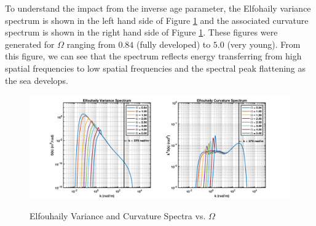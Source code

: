 To understand the impact from the inverse age parameter, the Elfohaily variance spectrum is shown in the left hand side of Figure \ref{os_fig:3a} and the associated curvature spectrum is shown in the right hand side of Figure \ref{os_fig:3a}. These figures were generated for $\Omega$ ranging from $0.84$ (fully developed) to $5.0$ (very young). From this figure, we can see that the spectrum reflects energy transferring from high spatial frequencies to low spatial frequencies and the spectral peak flattening as the sea develops.
\begin{figure}[H]
  \begin{center}
\includegraphics[width=6in]{../media/Ocean_Surface/elf_variance_curvature_spectrum_age.png}
  \end{center}
  \renewcommand{\baselinestretch}{1} \small\normalsize
  \begin{quote}
    \caption[Elfouhaily Variance and Curvature Spectra vs. $\Omega$]{Elfouhaily Variance and Curvature Spectra vs. $\Omega$ \label{os_fig:3a}}
  \end{quote}
\end{figure}
\renewcommand{\baselinestretch}{2} \small\normalsize

